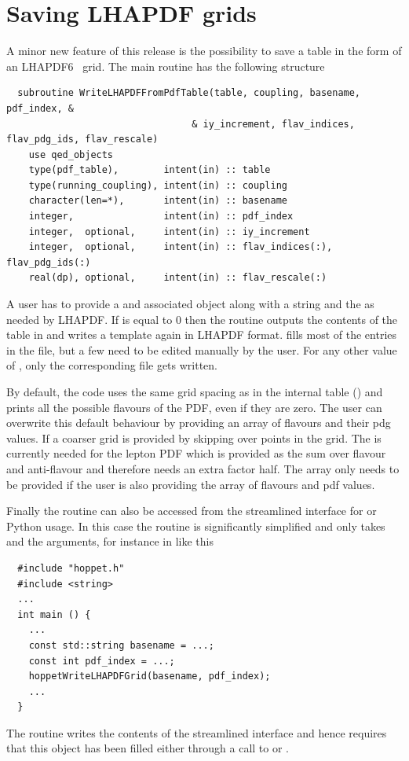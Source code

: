 \section{Saving LHAPDF grids}
\label{sec:lhapdf}
A minor new feature of this release is the possibility to save a
\hoppet{} table in the form of an LHAPDF6~\cite{LHAPDF} grid.
The main routine has the following structure
\begin{lstlisting}
  subroutine WriteLHAPDFFromPdfTable(table, coupling, basename, pdf_index, &
                                 & iy_increment, flav_indices, flav_pdg_ids, flav_rescale)                                
    use qed_objects
    type(pdf_table),        intent(in) :: table
    type(running_coupling), intent(in) :: coupling
    character(len=*),       intent(in) :: basename
    integer,                intent(in) :: pdf_index
    integer,  optional,     intent(in) :: iy_increment
    integer,  optional,     intent(in) :: flav_indices(:), flav_pdg_ids(:)
    real(dp), optional,     intent(in) :: flav_rescale(:)
\end{lstlisting}
A user has to provide a  and associated 
object along with a string  and the  as
needed by LHAPDF.
%
If  is equal to 0 then the routine
outputs the contents of the table in  and
writes a template  again in LHAPDF
format.
%
\hoppet{} fills most of the entries in the 
file, but a few need to be edited manually by the user.
%
For any other value of , only the corresponding
 file gets written.

By default, the code uses the same grid spacing as in the internal
\hoppet{} table () and prints all the possible
flavours of the PDF, even if they are zero.
%
The user can overwrite
this default behaviour by providing an array of flavours and their pdg
values.
%
If  a coarser grid is provided by
skipping over  points in the grid. The
 is currently needed for the lepton PDF which is
provided as the sum over flavour and anti-flavour and therefore needs
an extra factor half.
%
The  array only needs to be
provided if the user is also providing the array of flavours and pdf
values.

Finally the routine can also be accessed from the streamlined
interface for \CPP{} or Python usage. In this case the routine is
significantly simplified and only takes  and the
 arguments, for instance in \CPP{} like this
\begin{lstlisting}
  #include "hoppet.h"
  #include <string>
  ...
  int main () {
    ...
    const std::string basename = ...;
    const int pdf_index = ...;
    hoppetWriteLHAPDFGrid(basename, pdf_index);
    ...
  }
\end{lstlisting}
The routine writes the contents of the streamlined interface
 and hence requires that this object has been filled
either through a call to  or .

